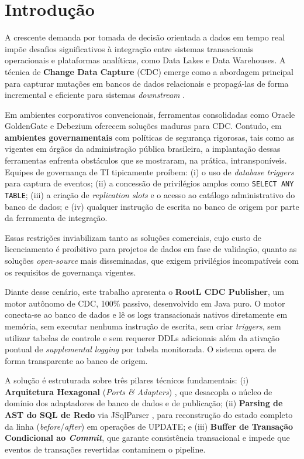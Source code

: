 \documentclass[12pt]{article}
\begin{document}
\section{Introdução}
\label{sec:intro}

A crescente demanda por tomada de decisão orientada a dados em tempo real
impõe desafios significativos à integração entre sistemas transacionais
operacionais e plataformas analíticas, como Data Lakes e Data Warehouses.
A técnica de \textbf{Change Data Capture} (CDC) emerge como a abordagem
principal para capturar mutações em bancos de dados relacionais e propagá-las
de forma incremental e eficiente para sistemas \textit{downstream}
\cite{kleppmann:2017}.

Em ambientes corporativos convencionais, ferramentas consolidadas como
Oracle GoldenGate e Debezium oferecem soluções maduras para CDC. Contudo,
em \textbf{ambientes governamentais} com políticas de segurança rigorosas, tais como as vigentes em órgãos da administração pública brasileira,
a implantação dessas ferramentas enfrenta obstáculos que se mostraram, na
prática, intransponíveis. Equipes de governança de TI tipicamente proíbem:
(i) o uso de \textit{database triggers} para captura de eventos;
(ii) a concessão de privilégios amplos como \texttt{SELECT ANY TABLE};
(iii) a criação de \textit{replication slots} e o acesso ao catálogo
administrativo do banco de dados; e
(iv) qualquer instrução de escrita no banco de origem por parte da
ferramenta de integração.

Essas restrições inviabilizam tanto as soluções comerciais, cujo custo de
licenciamento é proibitivo para projetos de dados em fase de validação,
quanto as soluções \textit{open-source} mais disseminadas, que exigem
privilégios incompatíveis com os requisitos de governança vigentes.

Diante desse cenário, este trabalho apresenta o \textbf{RootL CDC Publisher},
um motor autônomo de CDC, 100\% passivo, desenvolvido em Java puro. O motor
conecta-se ao banco de dados e lê os logs transacionais nativos diretamente
em memória, sem executar nenhuma instrução de escrita, sem criar
\textit{triggers}, sem utilizar tabelas de controle e sem requerer DDLs
adicionais além da ativação pontual de \textit{supplemental logging} por
tabela monitorada. O sistema opera de forma transparente ao banco de origem.

A solução é estruturada sobre três pilares técnicos fundamentais:
(i) \textbf{Arquitetura Hexagonal} (\textit{Ports \& Adapters})
\cite{cockburn:2005}, que desacopla o núcleo de domínio dos adaptadores de
banco de dados e de publicação; (ii) \textbf{Parsing de AST do SQL de Redo}
via JSqlParser \cite{aho:2006}, para reconstrução do estado completo da
linha (\textit{before}/\textit{after}) em operações de UPDATE; e
(iii) \textbf{Buffer de Transação Condicional ao \textit{Commit}}, que
garante consistência transacional e impede que eventos de transações
revertidas contaminem o pipeline.
\end{document}
